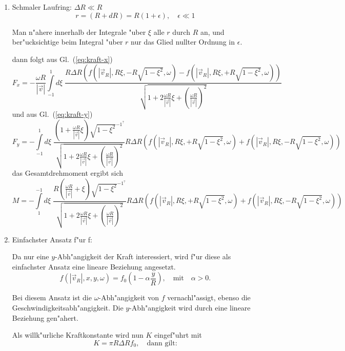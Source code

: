 \documentclass[a4paper]{report}
\newcommand{\eqlab}[1]{\label{eq:#1}}
\newcommand{\eqref}[1]{Gl.~(\ref{eq:#1})}
\newcommand{\vRo}{ \vec{v}   }   %
\newcommand{\vRi}{ \vec{v}_R }   %
\newcommand{\vRiAbsDivvRoXI}[1]{\sqrt{\displaystyle
    1 + 2\frac{\omega #1}{|\vRo|}\xi +
    \left( \frac{\omega #1}{|\vRo|} \right)^2 } }
\newcommand{\SubstCos}{ \sqrt{1-\xi^2} }
\newcommand{\fpolar}[2]{ f( |\vRi| , #2 \xi, #1 #2 \SubstCos ,\omega) }
\newcommand{\Int}{\int\limits}
\begin{document}
\begin{enumerate}
\item Schmaler Laufring: $ \Delta R \ll R $
%
\begin{equation}
r = (R + d R) = R(1+\epsilon), \quad \epsilon\ll 1
\end{equation}

Man n"ahere innerhalb der Integrale "uber $ \xi $ alle $ r $ durch $ R $ an, und
ber"ucksichtige beim Integral "uber $ r $ nur das Glied nullter %
Ordnung in $ \epsilon $.

dann folgt aus \eqref{kraft-x}
%
\begin{equation}
F_x = -\frac{\omega R}{|\vRo|}
\Int_{-1}^{1} d\xi\;\frac{R\Delta R\left(\fpolar{-}{R}-\fpolar{+}{R}\right)}%
			 { \vRiAbsDivvRoXI{R}  }
\eqlab{kraft-x-R}
\end{equation}
%
und aus \eqref{kraft-y}
%
\begin{equation}
F_y =  -\Int_{-1}^{1}d\xi\;
    \frac{ \left( 1 + \frac{\omega R}{|\vRo|}\xi \right)
             \SubstCos^{-1^?}
         }{ \vRiAbsDivvRoXI{R}  }
    R \Delta R
    \left( \fpolar{+}{R} + \fpolar{-}{R} \right)
    \eqlab{kraft-y-R}
\end{equation}
%
das Gesamtdrehmoment ergibt sich
%
\begin{equation}
\eqlab{GesamtDrehmoment}
M = -\Int_{1}^{-1}d\xi\;
    \frac{ R \left( \frac{\omega R}{|\vRo|} + \xi \right)
             \SubstCos^{-1^?}
         }{ \vRiAbsDivvRoXI{R}  }
	R \Delta R
	\left( \fpolar{+}{R} + \fpolar{-}{R} \right)
    \eqlab{drehmoment-R}
\end{equation}

\item Einfachster Ansatz f"ur f:

Da nur eine $ y $-Abh"angigkeit der Kraft interessiert, wird f"ur diese als
einfachster Ansatz eine lineare Beziehung angesetzt.
%
\begin{equation}
f(|\vRi|,x,y,\omega) = f_0\left(1-\alpha\frac{y}{R}\right),
\quad \textrm{mit}\quad \alpha > 0.
\eqlab{kraft-linear}
\end{equation}

Bei diesem Ansatz ist die $ \omega $-Abh"angigkeit von $ f $ vernachl"assigt, ebenso
die Geschwindigkeitsabh"angigkeit. Die $ y $-Abh"angigkeit wird durch eine lineare
Beziehung gen"ahert.

Als willk"urliche Kraftkonstante wird nun $ K $ eingef"uhrt mit
%
\begin{displaymath}
K = \pi R \Delta R f_0, \quad\textrm{dann gilt:}
\end{displaymath}


\end{enumerate}
\end{document}
